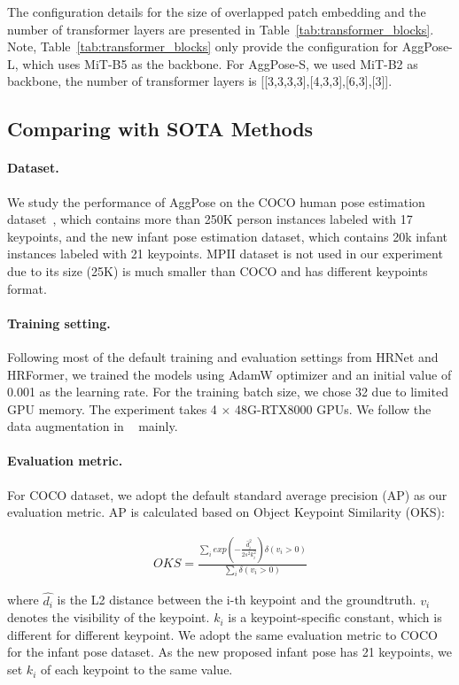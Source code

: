 \documentclass{article}
\begin{document}
The configuration details for the size of overlapped patch embedding and the number of transformer layers are presented in Table~\ref{tab:transformer_blocks}. Note, Table~\ref{tab:transformer_blocks} only provide the configuration for AggPose-L, which uses MiT-B5 as the backbone. For AggPose-S, we used MiT-B2 as backbone, the number of transformer layers is [[3,3,3,3],[4,3,3],[6,3],[3]].

\subsection{Comparing with SOTA Methods}

\paragraph{Dataset.} We study the performance of AggPose on the COCO human pose estimation dataset~\cite{lin2014microsoft}, which contains more than 250K person instances labeled with 17 keypoints, and the new infant pose estimation dataset, which contains 20k infant instances labeled with 21 keypoints. MPII dataset is not used in our experiment due to its size (25K) is much smaller than COCO and has different keypoints format.

\paragraph{Training setting.} Following most of the default training and evaluation settings from HRNet and HRFormer, we trained the models using AdamW optimizer and an initial value of 0.001 as the learning rate. For the training batch size, we chose 32 due to limited GPU memory. The experiment takes 4 $\times$ 48G-RTX8000 GPUs. We follow the data augmentation in ~\cite{wang2020deep} mainly. 

\paragraph{Evaluation metric.} For COCO dataset, we adopt the default standard average precision (AP) as our evaluation metric. AP is calculated based on Object Keypoint Similarity (OKS):

\begin{align}
    OKS = \frac{\sum_{i}exp(-\frac{\hat{d}_{i}^{2}}{2s^{2}k_{i}^{2}})\delta(v_{i} > 0)}{\sum_{i}\delta(v_{i} > 0)}
\end{align}

where $\hat{d_i}$ is the L2 distance between the i-th keypoint and the groundtruth. $v_{i}$ denotes the visibility of the keypoint. $k_i$ is a keypoint-specific constant, which is different for different keypoint. We adopt the same evaluation metric to COCO for the infant pose dataset. As the new proposed infant pose has 21 keypoints, we set $k_i$ of each keypoint to the same value.
\end{document}
